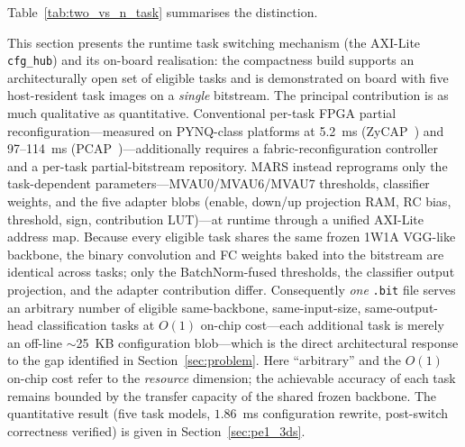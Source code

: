 \documentclass[12pt, a4paper]{report}
\numberwithin{equation}{chapter}
\numberwithin{figure}{chapter}
\numberwithin{table}{chapter}
\numberwithin{algorithm}{chapter}
\begin{document}
Table~\ref{tab:two_vs_n_task} summarises the distinction.

\begin{table}[H]
\centering
\caption{Two-Task vs.\ \texorpdfstring{$N$}{N}-Task Switching at a Glance.}
\label{tab:two_vs_n_task}
\end{table}


This section presents the runtime task switching mechanism (the AXI-Lite \texttt{cfg\_hub}) and its on-board realisation: the compactness build supports an architecturally open set of eligible tasks and is demonstrated on board with five host-resident task images on a \emph{single} bitstream. The principal contribution is as much qualitative as quantitative. Conventional per-task FPGA partial reconfiguration---measured on PYNQ-class platforms at 5.2~ms (ZyCAP~\cite{Rangsikunpum2024CoarseToFine}) and 97--114~ms (PCAP~\cite{Huang2024ACNNE})---additionally requires a fabric-reconfiguration controller and a per-task partial-bitstream repository. MARS instead reprograms only the task-dependent parameters---MVAU0/MVAU6/MVAU7 thresholds, classifier weights, and the five adapter blobs (enable, down/up projection RAM, RC bias, threshold, sign, contribution LUT)---at runtime through a unified AXI-Lite address map. Because every eligible task shares the same frozen 1W1A VGG-like backbone, the binary convolution and FC weights baked into the bitstream are identical across tasks; only the BatchNorm-fused thresholds, the classifier output projection, and the adapter contribution differ. Consequently \emph{one} \texttt{.bit} file serves an arbitrary number of eligible same-backbone, same-input-size, same-output-head classification tasks at $O(1)$ on-chip cost---each additional task is merely an off-line $\sim$25~KB configuration blob---which is the direct architectural response to the gap identified in Section~\ref{sec:problem}. Here ``arbitrary'' and the $O(1)$ on-chip cost refer to the \emph{resource} dimension; the achievable accuracy of each task remains bounded by the transfer capacity of the shared frozen backbone. The quantitative result (five task models, $1.86$~ms configuration rewrite, post-switch correctness verified) is given in Section~\ref{sec:pe1_3ds}.
\end{document}
